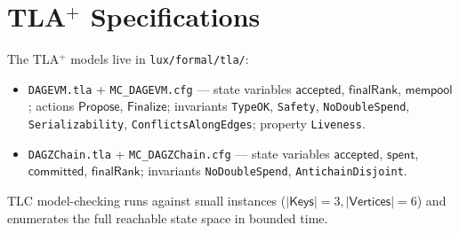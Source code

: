 \section{TLA$^+$ Specifications}

\label{sec:tla}

The TLA$^+$ models live in \texttt{lux/formal/tla/}:

\begin{itemize}
  \item \texttt{DAGEVM.tla} + \texttt{MC\_DAGEVM.cfg} — state variables
    $\mathsf{accepted}$, $\mathsf{finalRank}$, $\mathsf{mempool}$;
    actions $\mathsf{Propose}$, $\mathsf{Finalize}$; invariants
    \texttt{TypeOK}, \texttt{Safety}, \texttt{NoDoubleSpend},
    \texttt{Serializability}, \texttt{ConflictsAlongEdges}; property
    \texttt{Liveness}.
  \item \texttt{DAGZChain.tla} + \texttt{MC\_DAGZChain.cfg} — state
    variables $\mathsf{accepted}$, $\mathsf{spent}$, $\mathsf{committed}$,
    $\mathsf{finalRank}$; invariants \texttt{NoDoubleSpend},
    \texttt{AntichainDisjoint}.
\end{itemize}

TLC model-checking runs against small instances
($|\mathsf{Keys}| = 3, |\mathsf{Vertices}| = 6$) and enumerates the full
reachable state space in bounded time.

